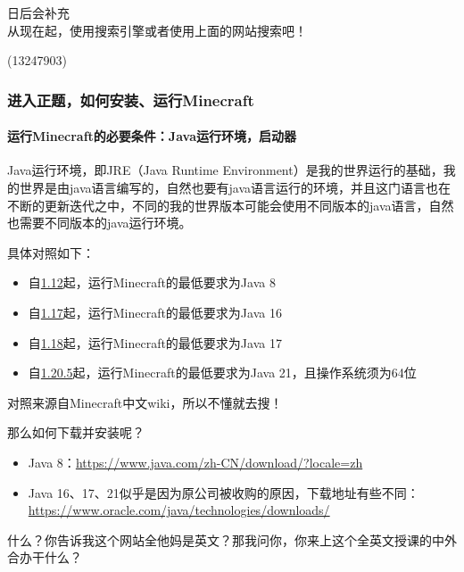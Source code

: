 \documentclass[
]{article}
\providecommand{\tightlist}{%
  \setlength{\itemsep}{0pt}\setlength{\parskip}{0pt}}
\begin{document}
日后会补充\\
从现在起，使用搜索引擎或者使用上面的网站搜索吧！

\begin{flushright}(13247903)\end{flushright}

\subsubsection{进入正题，如何安装、运行Minecraft}\label{minecraft-2}

\paragraph{运行Minecraft的必要条件：Java运行环境，启动器}\label{minecraftjava}

Java运行环境，即JRE（Java Runtime
Environment）是我的世界运行的基础，我的世界是由java语言编写的，自然也要有java语言运行的环境，并且这门语言也在不断的更新迭代之中，不同的我的世界版本可能会使用不同版本的java语言，自然也需要不同版本的java运行环境。

具体对照如下：

\begin{itemize}
\tightlist
\item
  自\href{https://zh.minecraft.wiki/w/17w13a}{1.12}起，运行Minecraft的最低要求为Java
  8
\item
  自\href{https://zh.minecraft.wiki/w/21w19a}{1.17}起，运行Minecraft的最低要求为Java
  16
\item
  自\href{https://zh.minecraft.wiki/w/Java版1.18-pre2}{1.18}起，运行Minecraft的最低要求为Java
  17
\item
  自\href{https://zh.minecraft.wiki/w/24w14a}{1.20.5}起，运行Minecraft的最低要求为Java
  21，且操作系统须为64位
\end{itemize}

对照来源自Minecraft中文wiki，所以不懂就去搜！

那么如何下载并安装呢？

\begin{itemize}
\tightlist
\item
  Java 8：\url{https://www.java.com/zh-CN/download/?locale=zh}
\item
  Java
  16、17、21似乎是因为原公司被收购的原因，下载地址有些不同：\url{https://www.oracle.com/java/technologies/downloads/}
\end{itemize}

什么？你告诉我这个网站全他妈是英文？那我问你，你来上这个全英文授课的中外合办干什么？
\end{document}
